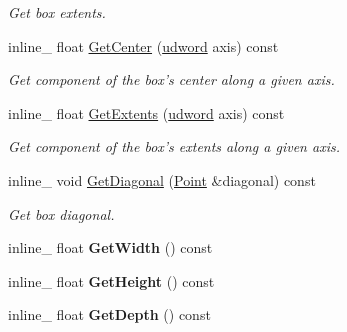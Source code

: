 \begin{DoxyCompactItemize}
\begin{DoxyCompactList}\small\item\em Get box extents. \end{DoxyCompactList}\item 
\hypertarget{class_a_a_b_b_aebbb26fe0c3d93c062d698e9c5b5a74e}{inline\+\_\+ float \hyperlink{class_a_a_b_b_aebbb26fe0c3d93c062d698e9c5b5a74e}{Get\+Center} (\hyperlink{_ice_types_8h_a44c6f1920ba5551225fb534f9d1a1733}{udword} axis) const }\label{class_a_a_b_b_aebbb26fe0c3d93c062d698e9c5b5a74e}

\begin{DoxyCompactList}\small\item\em Get component of the box's center along a given axis. \end{DoxyCompactList}\item 
\hypertarget{class_a_a_b_b_aea26078bba53d349784874129f57c43a}{inline\+\_\+ float \hyperlink{class_a_a_b_b_aea26078bba53d349784874129f57c43a}{Get\+Extents} (\hyperlink{_ice_types_8h_a44c6f1920ba5551225fb534f9d1a1733}{udword} axis) const }\label{class_a_a_b_b_aea26078bba53d349784874129f57c43a}

\begin{DoxyCompactList}\small\item\em Get component of the box's extents along a given axis. \end{DoxyCompactList}\item 
\hypertarget{class_a_a_b_b_a6d67e251acd758927015377cf984b5f8}{inline\+\_\+ void \hyperlink{class_a_a_b_b_a6d67e251acd758927015377cf984b5f8}{Get\+Diagonal} (\hyperlink{class_point}{Point} \&diagonal) const }\label{class_a_a_b_b_a6d67e251acd758927015377cf984b5f8}

\begin{DoxyCompactList}\small\item\em Get box diagonal. \end{DoxyCompactList}\item 
\hypertarget{class_a_a_b_b_ad7e334a58884b34d931593627b80f439}{inline\+\_\+ float {\bfseries Get\+Width} () const }\label{class_a_a_b_b_ad7e334a58884b34d931593627b80f439}

\item 
\hypertarget{class_a_a_b_b_a94ec6a1ad6ccdb538be061ea6c63c664}{inline\+\_\+ float {\bfseries Get\+Height} () const }\label{class_a_a_b_b_a94ec6a1ad6ccdb538be061ea6c63c664}

\item 
\hypertarget{class_a_a_b_b_a3ad1814f5600a0a73bcb36148c9afb20}{inline\+\_\+ float {\bfseries Get\+Depth} () const }\label{class_a_a_b_b_a3ad1814f5600a0a73bcb36148c9afb20}


\end{DoxyCompactItemize}
